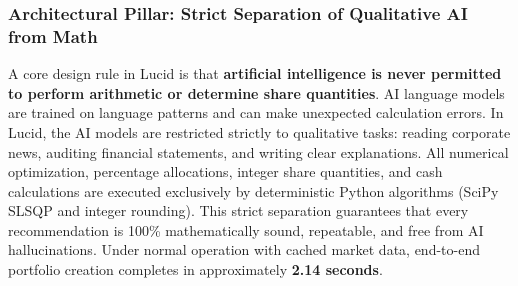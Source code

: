 \subsubsection{Architectural Pillar: Strict Separation of Qualitative AI from Math}
A core design rule in Lucid is that \textbf{artificial intelligence is never permitted to perform arithmetic or determine share quantities}. AI language models are trained on language patterns and can make unexpected calculation errors. In Lucid, the AI models are restricted strictly to qualitative tasks: reading corporate news, auditing financial statements, and writing clear explanations. All numerical optimization, percentage allocations, integer share quantities, and cash calculations are executed exclusively by deterministic Python algorithms (SciPy SLSQP and integer rounding). This strict separation guarantees that every recommendation is 100\% mathematically sound, repeatable, and free from AI hallucinations. Under normal operation with cached market data, end-to-end portfolio creation completes in approximately \textbf{2.14 seconds}.

